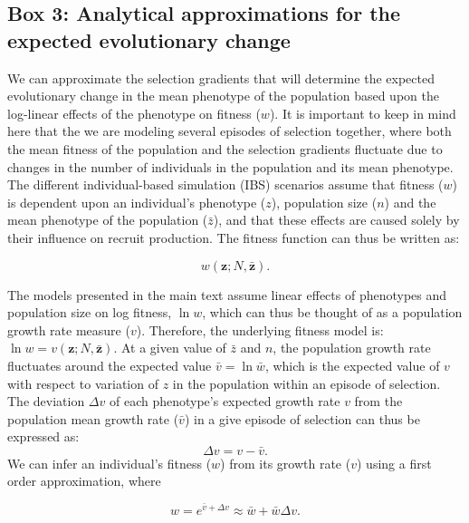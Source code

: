 \documentclass{article}
\begin{document}
\subsection{Box 3: Analytical approximations for the expected evolutionary change}
	\setcounter{table}{0}    
	
We can approximate the selection gradients that will determine the expected evolutionary change in the mean phenotype of the population based upon the log-linear effects of the phenotype on fitness ($w$). It is important to keep in mind here that the we are modeling several episodes of selection together, where both the mean fitness of the population and the selection gradients fluctuate due to changes in the number of individuals in the population and its mean phenotype. The different individual-based simulation (IBS) scenarios assume that fitness ($w$) is dependent upon an individual's phenotype ($z$), population size ($n$) and the mean phenotype of the population ($\bar{z}$), and that these effects are caused solely by their influence on recruit production. The fitness function can thus be written as:  		

\begin{equation}
 w(\bm z; N,\bar{\bm z}).  \tag{B3.1}\label{B32}
\end{equation}

The models presented in the main text assume linear effects of phenotypes and population size on log fitness, $\ln w$, which can thus be thought of as a population growth rate measure ($v$). Therefore, the underlying fitness model is: $\ln w=v(\bm z; N,\bar{\bm z}).$ At a given value of $\bar{z}$ and $n$, the population growth rate fluctuates around the expected value $\bar{v}=\ln \bar{w}$, which is the expected value of $v$ with respect to variation of $z$ in the population within an episode of selection. The deviation $\Delta v$ of each phenotype's expected growth rate $v$ from the population mean growth rate ($\bar{v}$) in a give episode of selection can thus be expressed as:
		\begin{equation}
\Delta v=v-\bar{v}. \tag{B3.2}\label{B33} 
	    \end{equation}
We can infer an individual's fitness ($w$) from its growth rate ($v$) using a first order approximation, where 

\begin{equation}
 w=e^{\bar{v}+\Delta v}\approx \bar{w}+\bar{w}\Delta v . \tag{B3.3}\label{B34} 
\end{equation}	
 	
\end{document}

